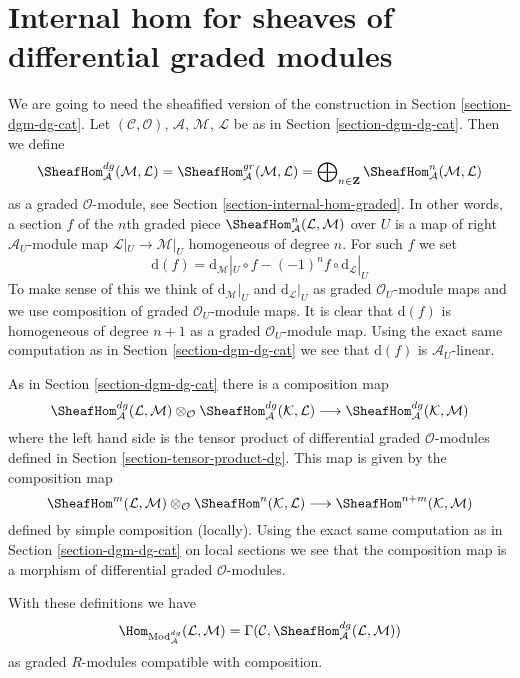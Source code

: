 \section{Internal hom for sheaves of differential graded modules}
\label{section-internal-hom-dg}

\noindent
We are going to need the sheafified version of the construction
in Section \ref{section-dgm-dg-cat}.
Let $(\mathcal{C}, \mathcal{O})$, $\mathcal{A}$,
$\mathcal{M}$, $\mathcal{L}$ be as in Section \ref{section-dgm-dg-cat}.
Then we define
$$
\SheafHom^{dg}_\mathcal{A}(\mathcal{M}, \mathcal{L}) =
\SheafHom^{gr}_\mathcal{A}(\mathcal{M}, \mathcal{L}) =
\bigoplus\nolimits_{n \in \mathbf{Z}}
\SheafHom^n_\mathcal{A}(\mathcal{M}, \mathcal{L})
$$
as a graded $\mathcal{O}$-module, see
Section \ref{section-internal-hom-graded}.
In other words, a section $f$ of the $n$th graded piece
$\SheafHom^n_\mathcal{A}(\mathcal{L}, \mathcal{M})$ over $U$
is a map of right $\mathcal{A}_U$-module map
$\mathcal{L}|_U \to \mathcal{M}|_U$ homogeneous of degree $n$.
For such $f$ we set
$$
\text{d}(f) =
\text{d}_\mathcal{M}|_U \circ f - (-1)^n f \circ \text{d}_\mathcal{L}|_U
$$
To make sense of this we think of $\text{d}_\mathcal{M}|_U$ and
$\text{d}_\mathcal{L}|_U$ as graded $\mathcal{O}_U$-module maps and
we use composition of graded $\mathcal{O}_U$-module maps.
It is clear that $\text{d}(f)$ is homogeneous of
degree $n + 1$ as a graded $\mathcal{O}_U$-module map.
Using the exact same computation as in Section \ref{section-dgm-dg-cat}
we see that $\text{d}(f)$ is $\mathcal{A}_U$-linear.

\medskip\noindent
As in Section \ref{section-dgm-dg-cat} there is a composition map
$$
\SheafHom^{dg}_\mathcal{A}(\mathcal{L}, \mathcal{M}) \otimes_\mathcal{O}
\SheafHom^{dg}_\mathcal{A}(\mathcal{K}, \mathcal{L})
\longrightarrow
\SheafHom^{dg}_\mathcal{A}(\mathcal{K}, \mathcal{M})
$$
where the left hand side is the tensor product of
differential graded $\mathcal{O}$-modules
defined in Section \ref{section-tensor-product-dg}. This map
is given by the composition map
$$
\SheafHom^m(\mathcal{L}, \mathcal{M}) \otimes_\mathcal{O}
\SheafHom^n(\mathcal{K}, \mathcal{L}) \longrightarrow
\SheafHom^{n + m}(\mathcal{K}, \mathcal{M})
$$
defined by simple composition (locally). Using the exact same
computation as in Section \ref{section-dgm-dg-cat} on local sections
we see that the composition map is a morphism of differential
graded $\mathcal{O}$-modules.

\medskip\noindent
With these definitions we have
$$
\Hom_{\text{Mod}^{dg}_\mathcal{A}}(\mathcal{L}, \mathcal{M}) =
\Gamma(\mathcal{C}, \SheafHom^{dg}_\mathcal{A}(\mathcal{L}, \mathcal{M}))
$$
as graded $R$-modules compatible with composition.









